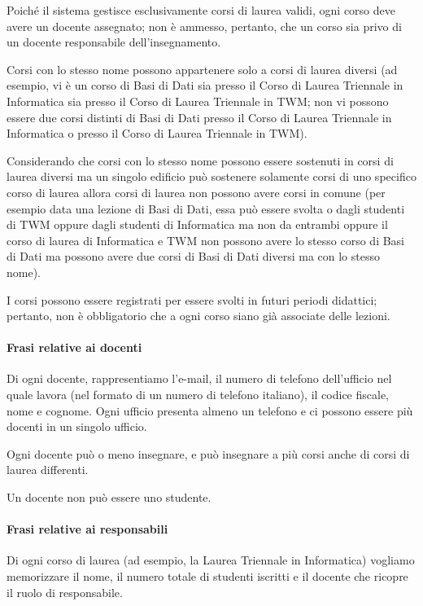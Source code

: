 \documentclass[a4paper,11pt]{article}
\begin{document}
Poiché il sistema gestisce esclusivamente corsi di laurea validi, ogni corso deve avere un docente assegnato; non è ammesso, pertanto, che un corso sia privo di un docente responsabile dell'insegnamento.

Corsi con lo stesso nome possono appartenere solo a corsi di laurea diversi (ad esempio, vi è un corso di Basi di Dati sia presso il Corso di Laurea Triennale in Informatica sia presso il Corso di Laurea Triennale in TWM; non vi possono essere due corsi distinti di Basi di Dati presso il Corso di Laurea Triennale in Informatica o presso il Corso di Laurea Triennale in TWM).

Considerando che corsi con lo stesso nome possono essere sostenuti in corsi di laurea diversi ma un singolo edificio può sostenere solamente corsi di uno specifico corso di laurea allora 
corsi di laurea non possono avere corsi in comune (per esempio data una lezione di Basi di Dati, essa può essere svolta o dagli studenti di TWM oppure dagli studenti di Informatica ma non da entrambi oppure il corso di laurea di Informatica e TWM non possono avere lo stesso corso di Basi di Dati ma possono avere due corsi di Basi di Dati diversi ma con lo stesso nome).

I corsi possono essere registrati per essere svolti in futuri periodi didattici; pertanto, non è obbligatorio che a ogni corso siano già associate delle lezioni.


\paragraph{Frasi relative ai docenti}

Di ogni docente, rappresentiamo l'e-mail, il numero di telefono dell'ufficio nel quale lavora (nel formato di un numero di telefono italiano), il codice fiscale, nome e cognome. Ogni ufficio presenta almeno un telefono e ci possono essere più docenti in un singolo ufficio.

Ogni docente può o meno insegnare, e può insegnare a più corsi anche di corsi di laurea differenti.

Un docente non può essere uno studente.


\paragraph{Frasi relative ai responsabili}

Di ogni corso di laurea (ad esempio, la Laurea Triennale in Informatica) vogliamo memorizzare il nome, il numero totale di studenti iscritti e il docente che ricopre il ruolo di responsabile.
\end{document}
